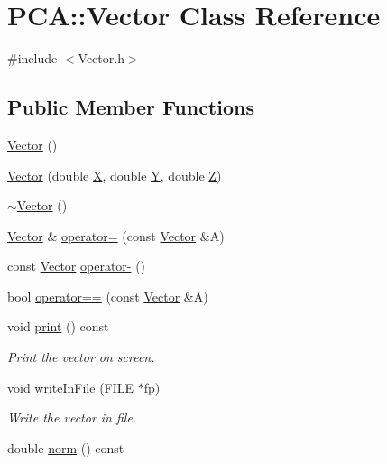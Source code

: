 \hypertarget{class_p_c_a_1_1_vector}{}\section{P\+CA\+:\+:Vector Class Reference}
\label{class_p_c_a_1_1_vector}


{\ttfamily \#include $<$Vector.\+h$>$}

\subsection*{Public Member Functions}
\begin{DoxyCompactItemize}
\item 
\hyperlink{class_p_c_a_1_1_vector_a978077a8e59322b44add93906e551719}{Vector} ()
\item 
\hyperlink{class_p_c_a_1_1_vector_aecc7fa6dbaffa3815fd23e4d8202c9b1}{Vector} (double \hyperlink{map_end_to_end_movie_8m_a24b667e00c87fc861ab4e0fbd342ec24}{X}, double \hyperlink{map_end_to_end_movie_8m_a0867f43e27585e019c13f7f4b7c4ab6b}{Y}, double \hyperlink{map_end_to_end_movie_8m_adc18d83abfd9f87d396e8fd6b6ac0fe1}{Z})
\item 
\hyperlink{class_p_c_a_1_1_vector_a3119a6ed9ccd0d7ac61bdfcbc9b7f1d3}{$\sim$\+Vector} ()
\item 
\hyperlink{class_p_c_a_1_1_vector}{Vector} \& \hyperlink{class_p_c_a_1_1_vector_ac93d124518b0f5e39dd1a0973dddc958}{operator=} (const \hyperlink{class_p_c_a_1_1_vector}{Vector} \&A)
\item 
const \hyperlink{class_p_c_a_1_1_vector}{Vector} \hyperlink{class_p_c_a_1_1_vector_ac94bf46625448a0ece199c2021993e6c}{operator-\/} ()
\item 
bool \hyperlink{class_p_c_a_1_1_vector_ae7a1abe13c8313d717b7bdb66934e92b}{operator==} (const \hyperlink{class_p_c_a_1_1_vector}{Vector} \&A)
\item 
void \hyperlink{class_p_c_a_1_1_vector_a6411d63770d6d711c5c854e21ca1776e}{print} () const
\begin{DoxyCompactList}\small\item\em Print the vector on screen. \end{DoxyCompactList}\item 
void \hyperlink{class_p_c_a_1_1_vector_a661570b8bb883ca11f033ea4dcdebb79}{write\+In\+File} (F\+I\+LE $\ast$\hyperlink{scaling_picture__new_8m_a883a1b899b644be7fc6d704c1d8e0c04}{fp})
\begin{DoxyCompactList}\small\item\em Write the vector in file. \end{DoxyCompactList}\item 
double \hyperlink{class_p_c_a_1_1_vector_a709eef286197f64e45f35fce0925ddf0}{norm} () const
\end{DoxyCompactItemize}
